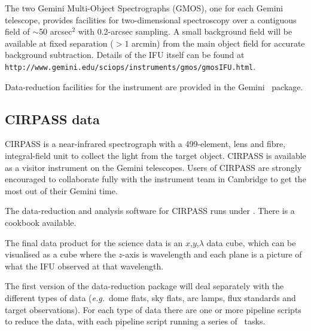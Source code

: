 \documentclass[twoside,11pt]{article}
\newcommand{\htmladdnormallink}[2]{#1}
\newcommand{\htmlref}[2]{#1}
\newcommand{\xlabel}[1]{}
\begin{document}
The two Gemini Multi-Object Spectrographs
(\htmladdnormallink{GMOS}{http://www.gemini.edu/sciops/instruments/gmos/gmosIndex.html}),
one for each Gemini telescope, provides facilities for two-dimensional
spectroscopy over a contiguous field of $\sim$50 arcsec$^2$ with
0.2-arcsec sampling.  A small background field will be available at
fixed separation ($>1$ arcmin) from the main object field for accurate
background subtraction.  Details of the IFU itself can be found at
\htmladdnormallink{{\tt
http://www.gemini.edu/sciops/instruments/gmos/gmosIFU.html}}{http://www.gemini.edu/sciops/instruments/gmos/gmosIFU.html}.

\htmladdnormallink{Data-reduction
facilities}{http://www.gemini.edu/sciops/instruments/gmos/gmosDataRed.html}
for the instrument are provided in the Gemini \IRAFref\ package.

\subsection{\xlabel{sc16_cirpass}CIRPASS data\label{sc16_cirpass}}

\htmladdnormallink{CIRPASS}{http://www.ast.cam.ac.uk/~optics/cirpass/}
is a near-infrared spectrograph with a 499-element, lens and fibre,
integral-field unit to collect the light from the target object.
CIRPASS is available as a visitor instrument on the Gemini telescopes.
Users of CIRPASS are strongly encouraged to collaborate fully with the
instrument team in Cambridge to get the most out of their Gemini time.

The \htmladdnormallink{data-reduction and analysis software for
CIRPASS}{http://www.ast.cam.ac.uk/~optics/cirpass/docs/install_cirp_software.html}
runs under \IRAFref.  There is a 
\htmladdnormallink{cookbook}{http://www.ast.cam.ac.uk/~optics/cirpass/datared/cookbook_sn1987a.php}
available.


The final data product for the science data is an $x$,$y$,$\lambda$ 
\htmlref{data cube}{sc16_teifufile}, which can be visualised as a
cube where the $z$-axis is wavelength and each plane is a picture of
what the IFU observed at that wavelength.

The first version of the \htmladdnormallink{data-reduction
package}{http://www.ast.cam.ac.uk/~optics/cirpass/docs/soft_spec.html}
will deal separately with the different types of data (\emph{e.g.}\
dome flats, sky flats, arc lamps, flux standards and target
observations).  For each type of data there are one or more pipeline
scripts to reduce the data, with each pipeline script running a series
of \IRAF\ tasks.
\end{document}
